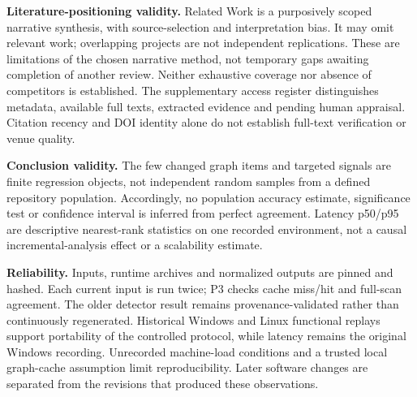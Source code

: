 \textbf{Literature-positioning validity.}
Related Work is a purposively scoped narrative synthesis, with source-selection and interpretation bias. It may omit relevant work; overlapping projects are not independent replications. These are limitations of the chosen narrative method, not temporary gaps awaiting completion of another review. Neither exhaustive coverage nor absence of competitors is established. The supplementary access register distinguishes metadata, available full texts, extracted evidence and pending human appraisal. Citation recency and DOI identity alone do not establish full-text verification or venue quality.

\textbf{Conclusion validity.}
The few changed graph items and targeted signals are finite regression objects, not independent random samples from a defined repository population. Accordingly, no population accuracy estimate, significance test or confidence interval is inferred from perfect agreement. Latency p50/p95 are descriptive nearest-rank statistics on one recorded environment, not a causal incremental-analysis effect or a scalability estimate.

\textbf{Reliability.}
Inputs, runtime archives and normalized outputs are pinned and hashed. Each current input is run twice; P3 checks cache miss/hit and full-scan agreement. The older detector result remains provenance-validated rather than continuously regenerated. Historical Windows and Linux functional replays support portability of the controlled protocol, while latency remains the original Windows recording. Unrecorded machine-load conditions and a trusted local graph-cache assumption limit reproducibility. Later software changes are separated from the revisions that produced these observations.
